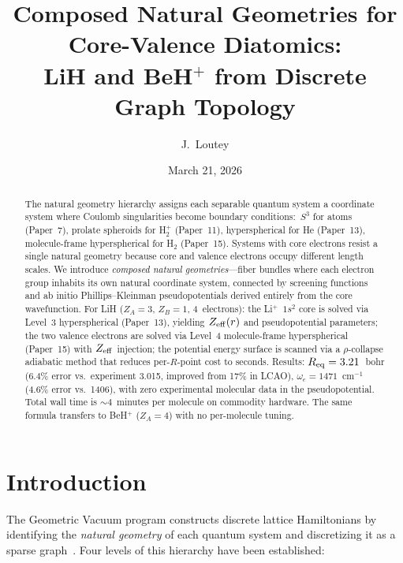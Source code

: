 \documentclass[aps,pra,twocolumn,superscriptaddress,longbibliography,floatfix]{revtex4-2}
\title{Composed Natural Geometries for Core-Valence Diatomics:\\
LiH and BeH$^+$ from Discrete Graph Topology}
\author{J.~Loutey}
\affiliation{Independent Researcher, Kent, Washington}
\date{March 21, 2026}
\begin{document}
\begin{abstract}
The natural geometry hierarchy assigns each separable quantum system
a coordinate system where Coulomb singularities become boundary
conditions:\ $S^3$ for atoms (Paper~7), prolate spheroids for
H$_2^+$ (Paper~11), hyperspherical for He (Paper~13), molecule-frame
hyperspherical for H$_2$ (Paper~15).
Systems with core electrons resist a single natural geometry because
core and valence electrons occupy different length scales.
We introduce \emph{composed natural geometries}---fiber bundles where
each electron group inhabits its own natural coordinate system,
connected by screening functions and ab initio Phillips--Kleinman
pseudopotentials derived entirely from the core wavefunction.
For LiH ($Z_A=3$, $Z_B=1$, 4~electrons): the Li$^+$~$1s^2$ core is
solved via Level~3 hyperspherical (Paper~13), yielding $Z_{\rm eff}(r)$
and pseudopotential parameters; the two valence electrons are solved via
Level~4 molecule-frame hyperspherical (Paper~15) with $Z_{\rm eff}$
injection; the potential energy surface is scanned via a $\rho$-collapse
adiabatic method that reduces per-$R$-point cost to seconds.
Results: $R_{\rm eq} = 3.21$~bohr (6.4\% error vs.\ experiment 3.015,
improved from 17\% in LCAO),
$\omega_e = 1471$~cm$^{-1}$ (4.6\% error vs.\ 1406),
with zero experimental molecular data in the pseudopotential.
Total wall time is ${\sim}4$~minutes per molecule on commodity hardware.
The same formula transfers to BeH$^+$ ($Z_A=4$) with no per-molecule
tuning.
\end{abstract}

\maketitle

\section{Introduction}
\label{sec:intro}

The Geometric Vacuum program constructs discrete lattice
Hamiltonians by identifying the \emph{natural geometry} of each
quantum system and discretizing it as a sparse graph~\cite{paper0,paper1,paper7}.
Four levels of this hierarchy have been established:
\end{document}

